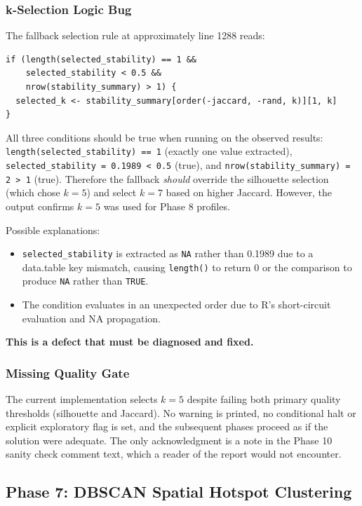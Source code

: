 \documentclass[11pt]{article}
\begin{document}
\subsubsection{k-Selection Logic Bug}

The fallback selection rule at approximately line 1288 reads:

\begin{verbatim}
if (length(selected_stability) == 1 &&
    selected_stability < 0.5 &&
    nrow(stability_summary) > 1) {
  selected_k <- stability_summary[order(-jaccard, -rand, k)][1, k]
}
\end{verbatim}

All three conditions should be true when running on the observed results:
\texttt{length(selected\_stability) == 1} (exactly one value extracted),
\texttt{selected\_stability = 0.1989 < 0.5} (true), and
\texttt{nrow(stability\_summary) = 2 > 1} (true). Therefore the fallback
\textit{should} override the silhouette selection (which chose $k=5$) and
select $k=7$ based on higher Jaccard. However, the output confirms $k=5$
was used for Phase 8 profiles.

Possible explanations:
\begin{itemize}
\item \texttt{selected\_stability} is extracted as \texttt{NA} rather than 0.1989
  due to a data.table key mismatch, causing \texttt{length()} to return 0 or
  the comparison to produce \texttt{NA} rather than \texttt{TRUE}.
\item The condition evaluates in an unexpected order due to R's short-circuit
  evaluation and NA propagation.
\end{itemize}

\textbf{This is a defect that must be diagnosed and fixed.}

\subsubsection{Missing Quality Gate}

The current implementation selects $k=5$ despite failing both primary quality
thresholds (silhouette and Jaccard). No warning is printed, no conditional halt
or explicit exploratory flag is set, and the subsequent phases proceed as if
the solution were adequate. The only acknowledgment is a note in the Phase 10
sanity check comment text, which a reader of the report would not encounter.

\subsection{Phase 7: DBSCAN Spatial Hotspot Clustering}
\end{document}
